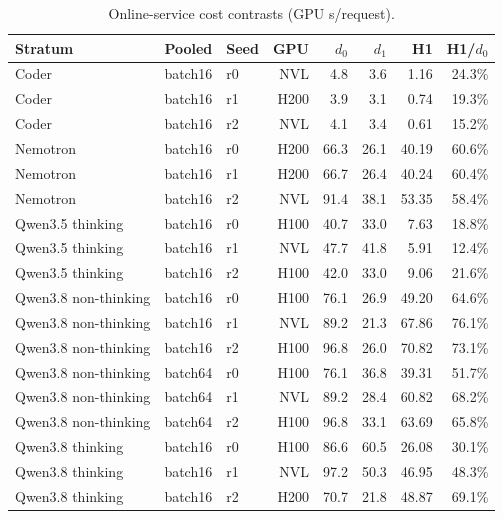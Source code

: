 
\begin{table}[t]
\caption{Online-service cost contrasts (GPU s/request).}
\label{tab:service-h1}
\centering\small
\begin{tabular}{lllrrrrr}
\toprule
Stratum & Pooled & Seed & GPU & $d_0$ & $d_1$ & H1 & H1/$d_0$ \\
\midrule
Coder & batch16 & r0 & NVL & 4.8 & 3.6 & 1.16 & 24.3\% \\
Coder & batch16 & r1 & H200 & 3.9 & 3.1 & 0.74 & 19.3\% \\
Coder & batch16 & r2 & NVL & 4.1 & 3.4 & 0.61 & 15.2\% \\
Nemotron & batch16 & r0 & H200 & 66.3 & 26.1 & 40.19 & 60.6\% \\
Nemotron & batch16 & r1 & H200 & 66.7 & 26.4 & 40.24 & 60.4\% \\
Nemotron & batch16 & r2 & NVL & 91.4 & 38.1 & 53.35 & 58.4\% \\
Qwen3.5 thinking & batch16 & r0 & H100 & 40.7 & 33.0 & 7.63 & 18.8\% \\
Qwen3.5 thinking & batch16 & r1 & NVL & 47.7 & 41.8 & 5.91 & 12.4\% \\
Qwen3.5 thinking & batch16 & r2 & H100 & 42.0 & 33.0 & 9.06 & 21.6\% \\
Qwen3.8 non-thinking & batch16 & r0 & H100 & 76.1 & 26.9 & 49.20 & 64.6\% \\
Qwen3.8 non-thinking & batch16 & r1 & NVL & 89.2 & 21.3 & 67.86 & 76.1\% \\
Qwen3.8 non-thinking & batch16 & r2 & H100 & 96.8 & 26.0 & 70.82 & 73.1\% \\
Qwen3.8 non-thinking & batch64 & r0 & H100 & 76.1 & 36.8 & 39.31 & 51.7\% \\
Qwen3.8 non-thinking & batch64 & r1 & NVL & 89.2 & 28.4 & 60.82 & 68.2\% \\
Qwen3.8 non-thinking & batch64 & r2 & H100 & 96.8 & 33.1 & 63.69 & 65.8\% \\
Qwen3.8 thinking & batch16 & r0 & H100 & 86.6 & 60.5 & 26.08 & 30.1\% \\
Qwen3.8 thinking & batch16 & r1 & NVL & 97.2 & 50.3 & 46.95 & 48.3\% \\
Qwen3.8 thinking & batch16 & r2 & H200 & 70.7 & 21.8 & 48.87 & 69.1\% \\
\bottomrule
\end{tabular}
\end{table}
